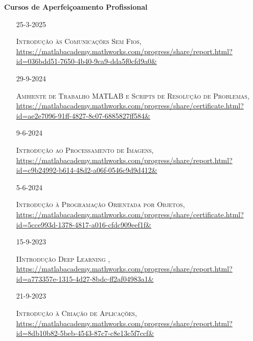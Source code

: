 \documentclass[10pt,a4paper,oneside]{article}
\newlength{\datewidth}
\newlength{\textindent}
\begin{document}
	\textbf{\hspace{\textindent}Cursos de Aperfeiçoamento Profissional}
	\begin{itemize}
	
	\item[\hspace{\datewidth}\scriptsize 25-3-2025] \parbox[t]{\dimexpr\linewidth-\datewidth-\textindent}{\textsc{Introdução às Comunicações Sem Fios}, \url{https://matlabacademy.mathworks.com/progress/share/report.html?id=036bdd51-7650-4b40-9ca9-dda5f0cfd9a0&}}
	
					
\item[\hspace{\datewidth}\scriptsize 29-9-2024] \parbox[t]{\dimexpr\linewidth-\datewidth-\textindent}{\textsc{Ambiente de Trabalho MATLAB e Scripts de Resolução de Problemas}, \url{https://matlabacademy.mathworks.com/progress/share/certificate.html?id=ae2e7096-91ff-4827-8c07-6885827ff584&}}

\item[\hspace{\datewidth}\scriptsize 9-6-2024] \parbox[t]{\dimexpr\linewidth-\datewidth-\textindent}{\textsc{Introdução ao Processamento de Imagens}, \url{https://matlabacademy.mathworks.com/progress/share/report.html?id=c9b24992-b614-48d2-a06f-0546c9d9d412&}}
	
\item[\hspace{\datewidth}\scriptsize 5-6-2024] \parbox[t]{\dimexpr\linewidth-\datewidth-\textindent}{\textsc{Introdução à Programação Orientada por Objetos}, \url{https://matlabacademy.mathworks.com/progress/share/certificate.html?id=5cce993d-1378-4817-a016-cfdc909eef1f&}}
		
\item[\hspace{\datewidth}\scriptsize 15-9-2023] \parbox[t]{\dimexpr\linewidth-\datewidth-\textindent}{\textsc{IIntrodução Deep Learning }, \url{https://matlabacademy.mathworks.com/progress/share/report.html?id=a773357e-1315-4d27-8bdc-ff2af04983a1&}}

\item[\hspace{\datewidth}\scriptsize 21-9-2023] \parbox[t]{\dimexpr\linewidth-\datewidth-\textindent}{\textsc{Introdução à Criação de Aplicações}, \url{https://matlabacademy.mathworks.com/progress/share/report.html?id=8db10b82-5beb-4543-87c7-c8e13c5f7ccf&}}




\end{itemize}
\end{document}
